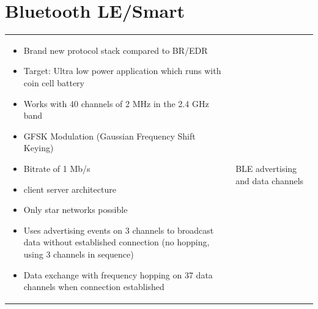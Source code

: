 \section{Bluetooth LE/Smart}
	\begin{tabular}{ll}
		\parbox{10cm}{
			\begin{itemize}
				\item Brand new protocol stack compared to BR/EDR
				\item Target: Ultra low power application which runs with coin cell battery
				\item Works with 40 channels of 2 MHz in the 2.4 GHz band
				\item GFSK Modulation (Gaussian Frequency Shift Keying)
				\item Bitrate of 1 Mb/s
				\item client server architecture
				\item Only star networks possible
				\item Uses advertising events on 3 channels to broadcast data without established connection (no hopping, using 3 channels in sequence)
				\item Data exchange with frequency hopping on 37 data channels when connection established
			\end{itemize}

		}	
		& \parbox{8cm}{
			 \\ BLE advertising and data channels }
	\end{tabular}
	
